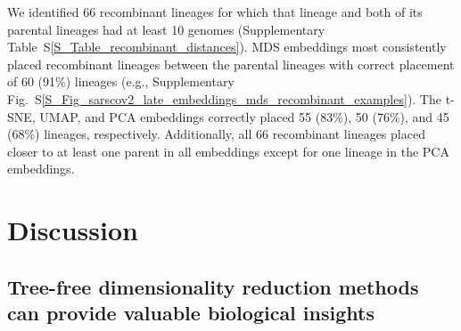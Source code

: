 \documentclass[webpdf,contemporary,large,single]{oup-authoring-template}%
\theoremstyle{thmstyleone}%
\theoremstyle{thmstyletwo}%
\theoremstyle{thmstylethree}%
\begin{document}
We identified 66 recombinant lineages for which that lineage and both of its parental lineages had at least 10 genomes (Supplementary Table~S\ref{S_Table_recombinant_distances}).
MDS embeddings most consistently placed recombinant lineages between the parental lineages with correct placement of 60 (91\%) lineages (e.g., Supplementary Fig.~S\ref{S_Fig_sarscov2_late_embeddings_mds_recombinant_examples}).
The t-SNE, UMAP, and PCA embeddings correctly placed 55 (83\%), 50 (76\%), and 45 (68\%) lineages, respectively.
Additionally, all 66 recombinant lineages placed closer to at least one parent in all embeddings except for one lineage in the PCA embeddings.

\section{Discussion}

\subsection{Tree-free dimensionality reduction methods can provide valuable biological insights}
\end{document}
